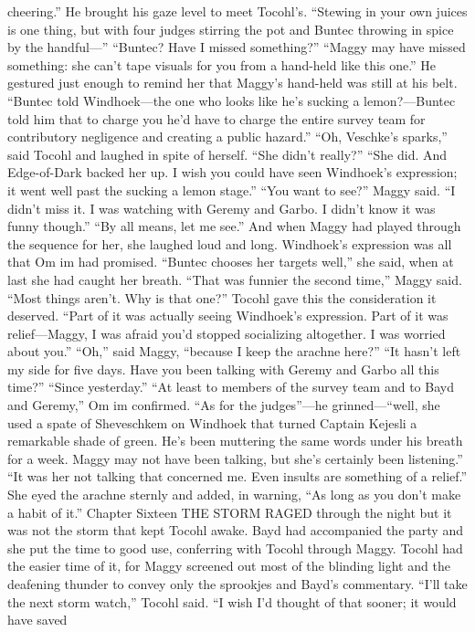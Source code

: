 \documentclass[9pt]{article}
\begin{document}
cheering.” He brought his gaze level to meet Tocohl’s. “Stewing in your own juices is one thing, but with
four judges stirring the pot and Buntec throwing in spice by the handful—”
“Buntec? Have I missed something?”
“Maggy may have missed something: she can’t tape visuals for you from a hand-held like this one.”
He gestured just enough to remind her that Maggy’s hand-held was still at his belt. “Buntec told
Windhoek—the one who looks like he’s sucking a lemon?—Buntec told him that to charge you he’d
have to charge the entire survey team for contributory negligence and creating a public hazard.”
“Oh, Veschke’s sparks,” said Tocohl and laughed in spite of herself. “She didn’t really?”
“She did. And Edge-of-Dark backed her up. I wish you could have seen Windhoek’s expression; it
went well past the sucking a lemon stage.”
“You want to see?” Maggy said. “I didn’t miss it. I was watching with Geremy and Garbo. I didn’t
know it was funny though.”
“By all means, let me see.” And when Maggy had played through the sequence for her, she laughed
loud and long. Windhoek’s expression was all that Om im had promised. “Buntec chooses her targets
well,” she said, when at last she had caught her breath.
“That was funnier the second time,” Maggy said. “Most things aren’t. Why is that one?”
Tocohl gave this the consideration it deserved. “Part of it was actually seeing Windhoek’s
expression. Part of it was relief—Maggy, I was afraid you’d stopped socializing altogether. I was
worried about you.”
“Oh,” said Maggy, “because I keep the arachne here?”
“It hasn’t left my side for five days. Have you been talking with Geremy and Garbo all this time?”
“Since yesterday.”
“At least to members of the survey team and to Bayd and Geremy,” Om im confirmed. “As for the
judges”—he grinned—“well, she used a spate of Sheveschkem on Windhoek that turned Captain Kejesli
a remarkable shade of green. He’s been muttering the same words under his breath for a week. Maggy
may not have been talking, but she’s certainly been listening.”
“It was her not talking that concerned me. Even insults are something of a relief.” She eyed the
arachne sternly and added, in warning, “As long as you don’t make a habit of it.”
Chapter Sixteen
THE STORM RAGED through the night but it was not the storm that kept Tocohl awake. Bayd
had accompanied the party and she put the time to good use, conferring with Tocohl through Maggy.
Tocohl had the easier time of it, for Maggy screened out most of the blinding light and the deafening
thunder to convey only the sprookjes and Bayd’s commentary.
“I’ll take the next storm watch,” Tocohl said. “I wish I’d thought of that sooner; it would have saved
\end{document}
